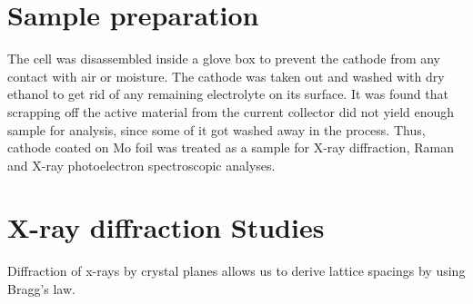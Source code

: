 \section*{Sample preparation}
The cell was disassembled inside a glove box to prevent the cathode from any contact with air or moisture. The cathode was taken out and washed with dry ethanol to get rid of any remaining electrolyte on its surface. It was found that scrapping off the active material from the current collector did not yield enough sample for analysis, since some of it got washed away in the process. Thus, cathode coated on Mo foil was treated as a sample for X-ray diffraction, Raman and X-ray photoelectron spectroscopic analyses.

\section{X-ray diffraction Studies}
Diffraction of x-rays by crystal planes allows us to derive lattice spacings by using Bragg's law. 

